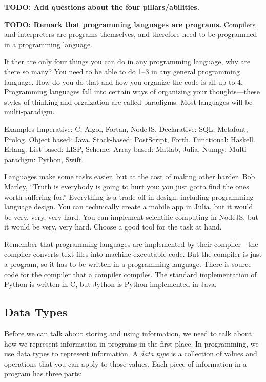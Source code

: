 \textbf{TODO: Add questions about the four pillars/abilities.}

\textbf{TODO: Remark that programming languages are programs.} Compilers and interpreters are programs themselves, and therefore need to be programmed in a programming language.

If ther are only four things you can do in any programming language, why are there so many? You need to be able to do 1--3 in any general programming language. How do you do that and how you organize the code is all up to 4. Programming languages fall into certain ways of organizing your thoughts---these styles of thinking and orgaization are called paradigms. Most languages will be multi-paradigm.

Examples Imperative: C, Algol, Fortan, NodeJS. Declarative: SQL, Metafont, Prolog. Object based: Java.  Stack-based: PostScript, Forth. Functional: Haskell. Erlang. List-based: LISP, Scheme. Array-based: Matlab, Julia, Numpy. Multi-paradigm: Python, Swift.

Languages make some tasks easier, but at the cost of making other harder. Bob Marley, ``Truth is everybody is going to hurt you: you just gotta find the ones worth suffering for.'' Everything is a trade-off in design, including programming language design. You can technically create a mobile app in Julia, but it would be very, very, very hard. You can implement scientific computing in NodeJS, but it would be very, very hard. Choose a good tool for the task at hand.

Remember that programming languages are implemented by their compiler---the compiler converts text files into machine executable code. But the compiler is just a program, so it has to be written in a programming language. There is source code for the compiler that a compiler compiles. The standard implementation of Python is written in C, but Jython is Python implemented in Java.

\subsection{Data Types}
Before we can talk about storing and using information, we need to talk about how we represent information in programs in the first place. In programming, we use data types to represent information. A \emph{data type} is a collection of values and operations that you can apply to those values. Each piece of information in a program has three parts:


